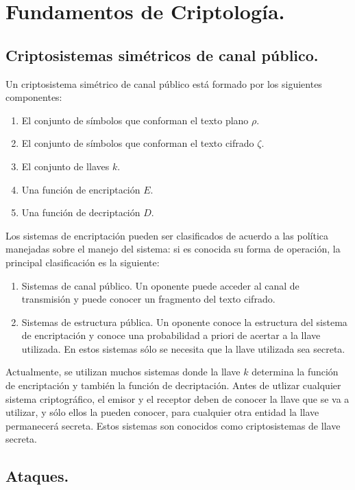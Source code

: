\documentclass[10pt]{IEEEtran}
\begin{document}
\section{Fundamentos de Criptología.}
\subsection*{Criptosistemas simétricos de canal público.}
Un criptosistema simétrico de canal público está formado por los siguientes componentes:
\begin{enumerate}
\item El conjunto de símbolos que conforman el texto plano $\rho.$
\item El conjunto de símbolos que conforman el texto cifrado $\zeta.$
\item El conjunto de llaves $k.$
\item Una función de encriptación $E$.
\item Una función de decriptación $D$.
\end{enumerate}

Los sistemas de encriptación pueden ser clasificados de acuerdo a las política manejadas sobre el manejo del sistema: si es conocida su forma de operación, la principal clasificación es la siguiente:

\begin{enumerate}
\item Sistemas de canal público. Un oponente puede acceder al canal de transmisión y puede conocer un fragmento del texto cifrado. 
\item Sistemas de estructura pública. Un oponente conoce la estructura del sistema de encriptación y  conoce una probabilidad a priori de acertar a la llave utilizada. En estos sistemas sólo se necesita que la llave utilizada sea secreta. 
\end{enumerate}

Actualmente, se utilizan muchos sistemas donde la llave $k$ determina la función de encriptación y también la función de decriptación. Antes de utlizar cualquier sistema criptográfico, el emisor y el receptor deben de conocer la llave que se va a utilizar, y sólo ellos la pueden conocer, para cualquier otra entidad la llave permanecerá secreta. Estos sistemas son conocidos como criptosistemas de llave secreta.


\subsection*{Ataques.}
\end{document}
